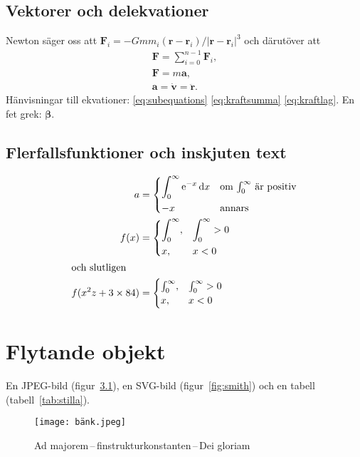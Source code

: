 \documentclass[a4paper, article, oneside]{memoir}
\begin{document}
\section{Vektorer och delekvationer}
Newton säger oss att $\mathbf{F}_i = -Gmm_i(\mathbf{r}-\mathbf{r}_i)/|\mathbf{r}-\mathbf{r}_i|^3$ och därutöver att
\begin{subequations}
\label{eq:subequations}
\begin{gather}
\mathbf{F} = \sum_{i=0}^{n-1} \mathbf{F}_i, \label{eq:kraftsumma} \\
\mathbf{F} = m\mathbf{a} \label{eq:kraftlag}, \\
\mathbf{a} = \dot{\mathbf{v}} = \ddot{\mathbf{r}}.
\end{gather}
\end{subequations}
Hänvisningar till ekvationer: \ref{eq:subequations} \ref{eq:kraftsumma} \ref{eq:kraftlag}. En fet grek: $\boldsymbol{\beta}$.

\section{Flerfallsfunktioner och inskjuten text}

\begin{align}
  a &=
  \begin{dcases*}
      \int_0^\infty \mathrm{e}^{-x}\,\mathrm{d}x & om $\int_0^\infty$ är positiv\\
    -x & annars
  \end{dcases*} \\
  f(x) &=
  \begin{dcases}
    \int_0^\infty, & \int_0^\infty > 0 \\
    x, & x < 0
  \end{dcases} \\
\shortintertext{och slutligen}
  f(x^2z+3\times 84) &=
  \begin{cases}
    \int_0^\infty, & \int_0^\infty > 0 \\
    x, & x < 0
  \end{cases}
\end{align}

\chapter{Flytande objekt}

En JPEG-bild (figur~\ref{fig:bänk}), en SVG-bild (figur~\ref{fig:smith}) och en tabell (tabell~\ref{tab:stilla}).

\begin{figure}[ht]
\centering
\texttt{[image: bänk.jpeg]}
\caption{Ad majorem\,--\,finstrukturkonstanten\,--\,Dei gloriam}
\label{fig:bänk}
\end{figure}
\end{document}
